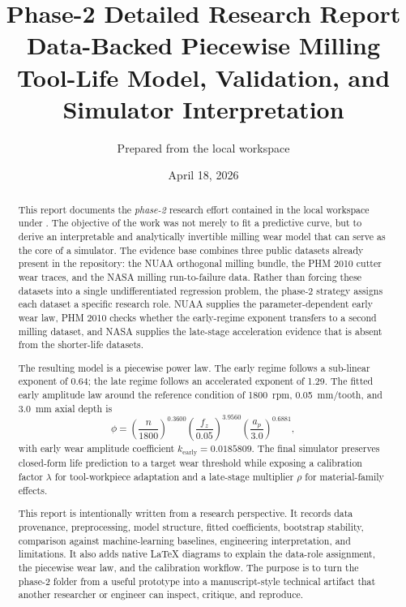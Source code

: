 \documentclass[11pt,a4paper]{article}
\title{\textbf{Phase-2 Detailed Research Report}\\[0.4em]
Data-Backed Piecewise Milling Tool-Life Model, Validation, and Simulator Interpretation}
\author{Prepared from the local \code{phase -2} workspace}
\date{April 18, 2026}
\newcommand{\phii}{\phi}
\begin{document}
\maketitle
\thispagestyle{empty}

\begin{abstract}
This report documents the \emph{phase-2} research effort contained in the local workspace under
. The objective of the work was not merely to fit a predictive curve, but to derive an
interpretable and analytically invertible milling wear model that can serve as the core of a simulator.
The evidence base combines three public datasets already present in the repository: the NUAA orthogonal
milling bundle, the PHM 2010 cutter wear traces, and the NASA milling run-to-failure data. Rather than
forcing these datasets into a single undifferentiated regression problem, the phase-2 strategy assigns each
dataset a specific research role. NUAA supplies the parameter-dependent early wear law, PHM 2010
checks whether the early-regime exponent transfers to a second milling dataset, and NASA supplies the
late-stage acceleration evidence that is absent from the shorter-life datasets.

The resulting model is a piecewise power law. The early regime follows a sub-linear exponent of
\num{0.64}; the late regime follows an accelerated exponent of \num{1.29}. The fitted early amplitude
law around the reference condition of \SI{1800}{rpm}, \SI{0.05}{mm/tooth}, and \SI{3.0}{mm}
axial depth is
\[
\phii =
\left(\frac{n}{1800}\right)^{0.3600}
\left(\frac{f_z}{0.05}\right)^{3.9560}
\left(\frac{a_p}{3.0}\right)^{0.6881},
\]
with early wear amplitude coefficient \(k_{\mathrm{early}} = \num{0.0185809}\).
The final simulator preserves closed-form life prediction to a target wear threshold while exposing a
calibration factor \(\lambda\) for tool-workpiece adaptation and a late-stage multiplier \(\rho\) for
material-family effects.

This report is intentionally written from a research perspective. It records data provenance, preprocessing,
model structure, fitted coefficients, bootstrap stability, comparison against machine-learning baselines,
engineering interpretation, and limitations. It also adds native LaTeX diagrams to explain the data-role
assignment, the piecewise wear law, and the calibration workflow. The purpose is to turn the phase-2
folder from a useful prototype into a manuscript-style technical artifact that another researcher or engineer
can inspect, critique, and reproduce.
\end{abstract}
\end{document}
